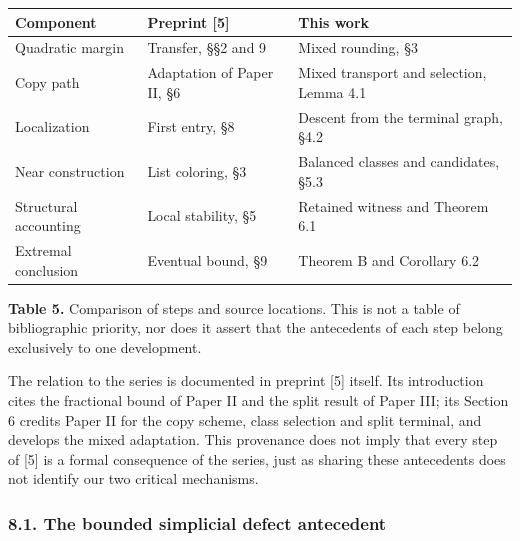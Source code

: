 \documentclass[english,11pt,a4paper]{article}
\newcounter{none}
\begin{document}
{\def\LTcaptype{none} %
\begin{longtable}[c]{@{}
  >{\raggedright\arraybackslash}p{}
  >{\raggedright\arraybackslash}p{}
  >{\raggedright\arraybackslash}p{}@{}}
\toprule\noalign{}
\begin{minipage}[b]{\linewidth}\raggedright
Component
\end{minipage} & \begin{minipage}[b]{\linewidth}\raggedright
Preprint {[}5{]}
\end{minipage} & \begin{minipage}[b]{\linewidth}\raggedright
This work
\end{minipage} \\
\midrule\noalign{}
\endhead
\bottomrule\noalign{}
\endlastfoot
Quadratic margin & Transfer, §§2 and 9 & Mixed rounding, §3 \\
Copy path & Adaptation of Paper II, §6 & Mixed transport and selection, Lemma 4.1 \\
Localization & First entry, §8 & Descent from the terminal graph, §4.2 \\
Near construction & List coloring, §3 & Balanced classes and candidates, §5.3 \\
Structural accounting & Local stability, §5 & Retained witness and Theorem 6.1 \\
Extremal conclusion & Eventual bound, §9 & Theorem B and Corollary 6.2 \\
\end{longtable}
}

\textbf{Table 5.} Comparison of steps and source locations. This is not a table of bibliographic priority, nor does it assert that the antecedents of each step belong exclusively to one development.

The relation to the series is documented in preprint {[}5{]} itself. Its introduction cites the fractional bound of Paper II and the split result of Paper III; its Section 6 credits Paper II for the copy scheme, class selection and split terminal, and develops the mixed adaptation. This provenance does not imply that every step of {[}5{]} is a formal consequence of the series, just as sharing these antecedents does not identify our two critical mechanisms.

\subsubsection{8.1. The bounded simplicial defect antecedent}\label{the-bounded-simplicial-defect-antecedent}
\end{document}
